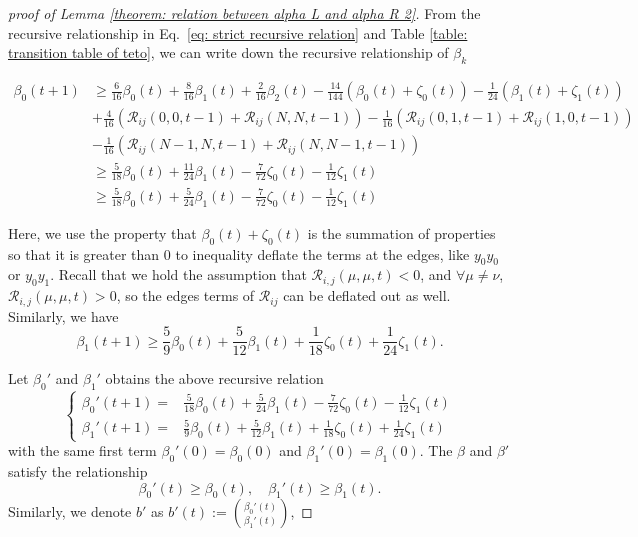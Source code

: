 \documentclass[showpacs,twocolumn,aps,prx,long bibliography,superscriptaddress,notitlepage]{revtex4-1}
\begin{document}
\begin{proof}[proof of Lemma \ref{theorem: relation between alpha L and alpha R 2}]
   From the recursive relationship in Eq.~\eqref{eq: strict recursive relation} and Table \ref{table: transition table of teto}, we can write down the recursive relationship of $\beta_k$
   \begin{widetext}
       \begin{align}
    \beta_0(t+1) & \geq \frac{6}{16} \beta_0(t)+\frac{8}{16} \beta_1(t) + \frac{2}{16}\beta_2(t)-\frac{14}{144}\left(\beta_0(t)+\zeta_0(t)\right)-\frac{1}{24}\left(\beta_1(t)+\zeta_1(t)\right)\nonumber\\
    & + \frac{4}{16}(\mathscr{R}_{i j}(0,0, t-1) + \mathscr{R}_{i j}(N,N, t-1)) -  \frac{1}{16}(\mathscr{R}_{i j}(0,1, t-1) + \mathscr{R}_{i j}(1,0, t-1))\nonumber\\
    &- \frac{1}{16}(\mathscr{R}_{i j}(N-1,N, t-1) + \mathscr{R}_{i j}(N,N-1, t-1))\nonumber\\
    & \geq \frac{5}{18} \beta_0(t)+\frac{11}{24} \beta_1(t)-\frac{7}{72} \zeta_0(t)-\frac{1}{12} \zeta_1(t) \\
    & \geq \frac{5}{18} \beta_0(t)+\frac{5}{24} \beta_1(t)-\frac{7}{72} \zeta_0(t)-\frac{1}{12} \zeta_1(t) 
    \end{align}
   \end{widetext}
    Here, we use the property that $\beta_0(t)+\zeta_0(t)$ is the summation of properties so that it is greater than $0$ to inequality deflate the terms at the edges, like $y_0y_0$ or $ y_0y_1$. Recall that we hold the assumption that $\mathscr{R}_{i, j}(\mu, \mu, t)<0$, and $\forall \mu \neq \nu$, $\mathscr{R}_{i, j}(\mu, \mu, t)>0$, so the edges terms of $\mathscr{R}_{i j}$ can be deflated out as well. Similarly, we have
    \begin{equation}
        \beta_1(t+1)  \geq \frac{5}{9} \beta_0(t)+\frac{5}{12} \beta_1(t)+\frac{1}{18} \zeta_0(t)+\frac{1}{24} \zeta_1(t).
    \end{equation}
    
    Let $\beta_0'$ and $\beta_1'$ obtains the above recursive relation
    \begin{equation}
        \begin{cases}
            \beta_0'(t+1) =& \frac{5}{18} \beta_0(t)+\frac{5}{24} \beta_1(t)-\frac{7}{72} \zeta_0(t)-\frac{1}{12} \zeta_1(t) \\
        \beta_1'(t+1)  =& \frac{5}{9} \beta_0(t)+\frac{5}{12} \beta_1(t)+\frac{1}{18} \zeta_0(t)+\frac{1}{24} \zeta_1(t)
        \end{cases}
        \label{eq: zz anonymous 25}
    \end{equation}
    with the same first term $\beta_0'(0) = \beta_0(0)$ and $\beta_1'(0) = \beta_1(0)$. The $\beta$ and $\beta'$ satisfy the relationship
    \begin{equation}
        \beta_0'(t) \geq \beta_0(t),\quad  \beta_1'(t) \geq \beta_1(t).
    \end{equation}
    Similarly, we denote $b'$ as $b'(t):=\binom{\beta_0'(t)}{\beta_1'(t)}$,
    

\end{proof}
\end{document}
